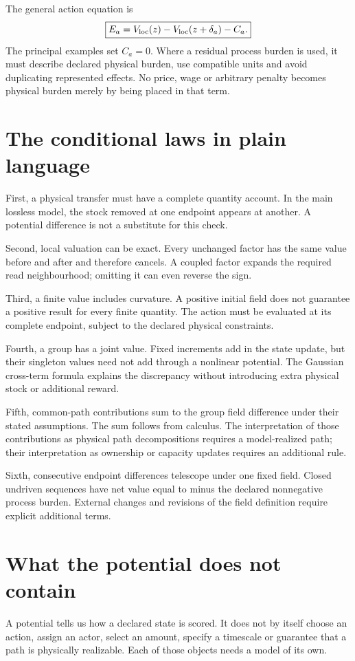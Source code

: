 The general action equation is
\begin{equation}\label{eq:final-ebu}
 \boxed{E_a=V_{\rm loc}(z)-V_{\rm loc}(z+\delta_a)-C_a.}
\end{equation}
The principal examples set $C_a=0$. Where a residual process burden is used, it must describe declared physical burden, use compatible units and avoid duplicating represented effects. No price, wage or arbitrary penalty becomes physical burden merely by being placed in that term.

\section{The conditional laws in plain language}
First, a physical transfer must have a complete quantity account. In the main lossless model, the stock removed at one endpoint appears at another. A potential difference is not a substitute for this check.

Second, local valuation can be exact. Every unchanged factor has the same value before and after and therefore cancels. A coupled factor expands the required read neighbourhood; omitting it can even reverse the sign.

Third, a finite value includes curvature. A positive initial field does not guarantee a positive result for every finite quantity. The action must be evaluated at its complete endpoint, subject to the declared physical constraints.

Fourth, a group has a joint value. Fixed increments add in the state update, but their singleton values need not add through a nonlinear potential. The Gaussian cross-term formula explains the discrepancy without introducing extra physical stock or additional reward.

Fifth, common-path contributions sum to the group field difference under their stated assumptions. The sum follows from calculus. The interpretation of those contributions as physical path decompositions requires a model-realized path; their interpretation as ownership or capacity updates requires an additional rule.

Sixth, consecutive endpoint differences telescope under one fixed field. Closed undriven sequences have net value equal to minus the declared nonnegative process burden. External changes and revisions of the field definition require explicit additional terms.

\section{What the potential does not contain}
A potential tells us how a declared state is scored. It does not by itself choose an action, assign an actor, select an amount, specify a timescale or guarantee that a path is physically realizable. Each of those objects needs a model of its own.

